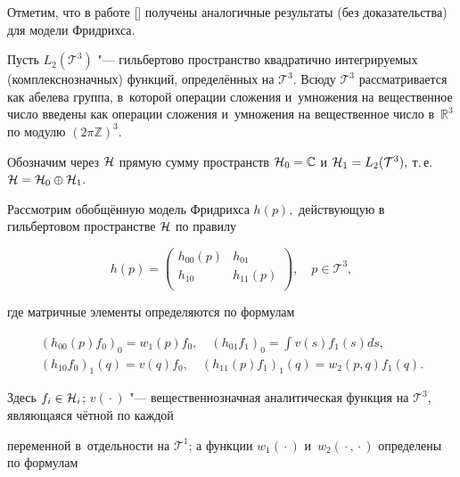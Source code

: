 Отметим, что в работе [] получены аналогичные результаты (без доказательства) для модели Фридрихса.







Пусть $L_2({\mathcal T}^3)$ "--- гильбертово пространство квадратично интегрируемых (комплекснозначных) функций, определённых на ${\mathcal T}^3.$  Всюду ${\mathcal T}^3$ рассматривается как абелева группа, в~которой операции сложения и~умножения на вещественное число введены как операции сложения и~умножения на вещественное число в~${\mathbb R}^3$ по модулю $(2\pi {\mathbb Z})^3$. 



Обозначим через $ {\cal H}$ прямую сумму пространств $ {\cal H}_0={\mathbb C}$ и $ {\cal H}_1=L_2({\mathcal T}^3),$ т.\,е. ${\cal H}={\cal H}_0 \oplus {\cal H}_1.$



Рассмотрим обобщённую модель Фридрихса $h(p),$ действующую в гильбертовом пространстве ${\cal{H}}$ по правилу

$$

h(p)=\left( \begin{array}{cc}

h_{00}(p) & h_{01}\\

h_{10} & h_{11}(p)\\

\end{array}

\right), \quad p\in {\mathcal T}^3,

$$

где матричные элементы определяются по формулам

\begin{gather*}

(h_{00}(p)f_0)_0=w_1(p)f_0,\quad (h_{01}f_1)_0=\int v(s)f_1(s)ds,

\\

(h_{10}f_0)_1(q)=v(q)f_0,\quad (h_{11}(p)f_1)_1(q)=w_2(p,q)f_1(q).

\end{gather*}

Здесь $f_i\in {\cal H}_i$; $v({}\cdot {})$ "--- вещественнозначная аналитическая функция на ${\mathcal T}^3$, являющаяся чётной по каждой

переменной в~отдельности на ${\mathcal T}^1$; а функции $w_1({}\cdot {})$ и~$w_2({}\cdot {}, {}\cdot{})$ определены по формулам

